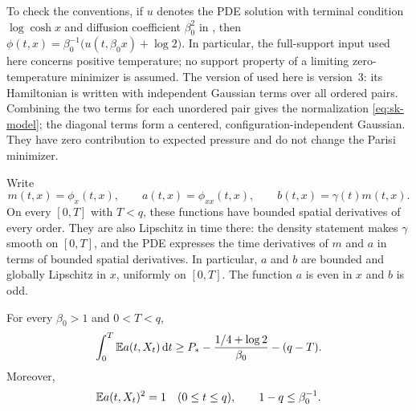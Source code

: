 To check the conventions, if $u$ denotes the PDE solution with terminal
condition $\log\cosh x$ and diffusion coefficient $\beta_0^2$ in
\cite{Lopatto2026}, then
$\phi(t,x)=\beta_0^{-1}\bigl(u(t,\beta_0x)+\log2\bigr)$.
In particular, the full-support input used here concerns positive
temperature; no support property of a limiting zero-temperature
minimizer is assumed. The version of \cite{Lopatto2026} used here is
version~3: its Hamiltonian is written with independent Gaussian terms
over all ordered pairs. Combining the two terms for each unordered
pair gives the normalization \eqref{eq:sk-model}; the diagonal terms
form a centered, configuration-independent Gaussian. They have zero
contribution to expected pressure and do not change the Parisi
minimizer.

Write
\begin{equation}
 m(t,x)=\phi_x(t,x),\qquad
 a(t,x)=\phi_{xx}(t,x),\qquad
 b(t,x)=\gamma(t)m(t,x).
 \label{eq:classical-coefficients}
\end{equation}
On every $[0,T]$ with $T<q$, these functions have bounded spatial
derivatives of every order.  They are also Lipschitz in time there:
the density statement makes $\gamma$ smooth on $[0,T]$, and the PDE
expresses the time derivatives of $m$ and $a$ in terms of bounded
spatial derivatives.  In particular, $a$ and $b$ are bounded and
globally Lipschitz in $x$, uniformly on $[0,T]$.
The function $a$ is even in $x$ and $b$ is odd.

\begin{lemma}
\label{lem:positive-temperature-bound}
For every $\beta_0>1$ and $0<T<q$,
\begin{equation}
 \int_0^T\mathbb E a(t,X_t)\,\mathrm d t
 \ge P_* -\frac{1/4+\log2}{\beta_0}-(q-T).
 \label{eq:positive-temperature-bound}
\end{equation}
Moreover,
\begin{equation}
 \mathbb E a(t,X_t)^2=1\quad(0\le t\le q),
 \qquad 1-q\le\beta_0^{-1}.
 \label{eq:parisi-normalization-and-endpoint}
\end{equation}
\end{lemma}


